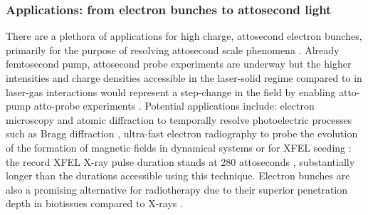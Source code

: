\subsubsection{Applications: from electron bunches to attosecond light}
There are a plethora of applications for high charge, attosecond electron bunches, primarily for the purpose of resolving attosecond scale phenomena \cite{krauszAttosecondPhysics2009}. Already femtosecond pump, attosecond probe experiments are underway \cite{calegariUltrafastElectronDynamics,takahashiNonlinearAttosecondMetrology2015} but the higher intensities and charge densities accessible in the laser-solid regime compared to in laser-gas interactions \cite{edwardsXRayEmissionEffectiveness2020, linIsolatedAttosecondElectron2020} would represent a step-change in the field by enabling atto-pump atto-probe experiments \cite{zhangGiantIsolatedAttosecond2020}. Potential applications include: electron microscopy and atomic diffraction to temporally resolve photoelectric processes such as Bragg diffraction \cite{morimotoDiffractionMicroscopyAttosecond2018}, ultra-fast electron radiography to probe the evolution of the formation of magnetic fields in dynamical systems \cite{schumakerUltrafastElectronRadiography2013} or for XFEL seeding \cite{cardenasSubcycleDynamicsRelativistic2019}: the record XFEL X-ray pulse duration stands at 280 attoseconds \cite{durisTunableIsolatedAttosecond2020}, substantially longer than the durations accessible using this technique. Electron bunches are also a promising alternative for radiotherapy due to their superior penetration depth in biotissues compared to X-rays \cite{glinecRadiotherapyLaserPlasma2006}.

